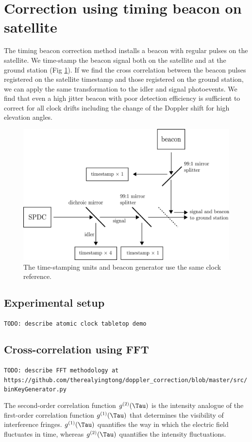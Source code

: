 \section{Correction using timing beacon on satellite}
The timing beacon correction method installs a beacon with regular pulses on the satellite. We time-stamp the beacon signal both on the satellite and at the ground station (Fig \ref{fig:beacon}). If we find the cross correlation between the beacon pulses registered on the satellite timestamp and those registered on the ground station, we can apply the same transformation to the idler and signal photoevents. We find that even a high jitter beacon with poor detection efficiency is sufficient to correct for all clock drifts including the change of the Doppler shift for high elevation angles.

\begin{figure}[ht!]
	\includegraphics[width=0.97\linewidth]{assets/beacon}
	\caption{The time-stamping units and beacon generator use the same clock reference.}
	\label{fig:beacon}
\end{figure}

\subsection{Experimental setup}
\texttt{TODO: describe atomic clock tabletop demo}

\subsection{Cross-correlation using FFT}
\texttt{TODO: describe FFT methodology at https://github.com/therealyingtong/doppler\_correction/blob/master/src/binKeyGenerator.py}

The second-order correlation function $g^{(2)}(\Tau)$ is the intensity analogue of the first-order correlation function $g^{(1)}(\Tau)$ that determines the visibility of interference fringes. $g^{(1)}(\Tau)$ quantifies the way in which the electric field fluctuates in time, whereas $g^{(2)}(\Tau)$ quantifies the intensity fluctuations.